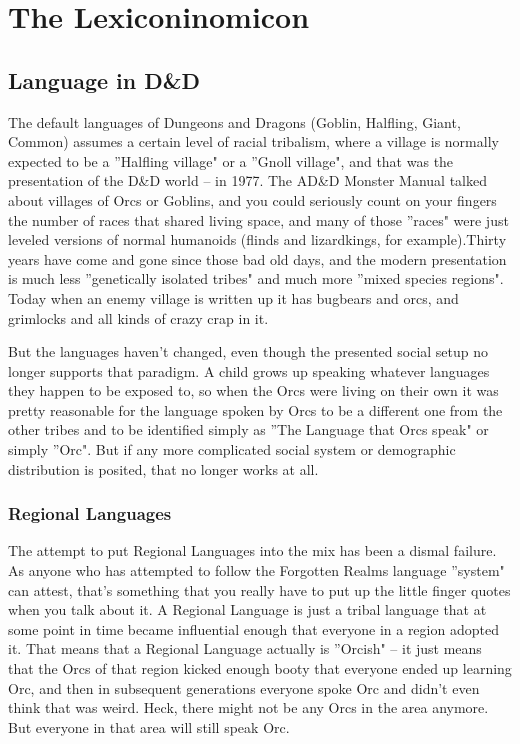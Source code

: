 \section{The Lexiconinomicon} %

\subsection{Language in D\&D}
\vspace*{-8pt}

The default languages of Dungeons and Dragons (Goblin, Halfling, Giant, Common) assumes a certain level of racial tribalism, where a village is normally expected to be a ''Halfling village" or a ''Gnoll village", and that was the presentation of the D\&D world -- in 1977. The AD\&D Monster Manual talked about villages of Orcs or Goblins, and you could seriously count on your fingers the number of races that shared living space, and many of those ''races" were just leveled versions of normal humanoids (flinds and lizardkings, for example).Thirty years have come and gone since those bad old days, and the modern presentation is much less ''genetically isolated tribes" and much more ''mixed species regions". Today when an enemy village is written up it has bugbears and orcs, and grimlocks and all kinds of crazy crap in it.

But the languages haven't changed, even though the presented social setup no longer supports that paradigm. A child grows up speaking whatever languages they happen to be exposed to, so when the Orcs were living on their own it was pretty reasonable for the language spoken by Orcs to be a different one from the other tribes and to be identified simply as ''The Language that Orcs speak" or simply ''Orc". But if any more complicated social system or demographic distribution is posited, that no longer works at all.

\subsubsection{Regional Languages}

The attempt to put Regional Languages into the mix has been a dismal failure. As anyone who has attempted to follow the Forgotten Realms language ''system" can attest, that's something that you really have to put up the little finger quotes when you talk about it. A Regional Language is just a tribal language that at some point in time became influential enough that everyone in a region adopted it. That means that a Regional Language actually is ''Orcish" -- it just means that the Orcs of that region kicked enough booty that everyone ended up learning Orc, and then in subsequent generations everyone spoke Orc and didn't even think that was weird. Heck, there might not be any Orcs in the area anymore. But everyone in that area will still speak Orc.

